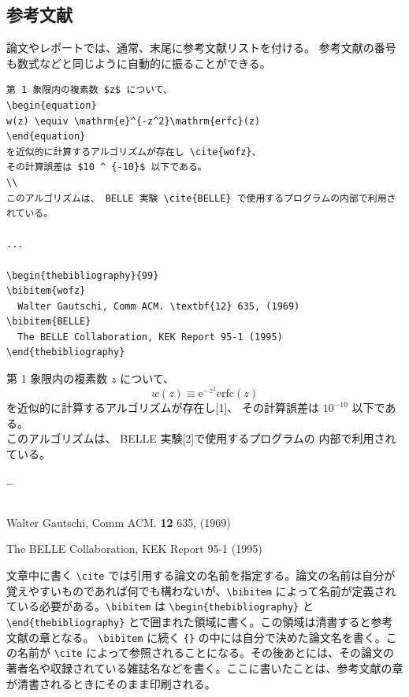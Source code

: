\subsection{参考文献}
\label{sec:latex:bibliography}

論文やレポートでは、通常、末尾に参考文献リストを付ける。
参考文献の番号も数式などと同じように自動的に振ることができる。
\begin{reidai}
\begin{verbatim}
第 1 象限内の複素数 $z$ について、
\begin{equation}
w(z) \equiv \mathrm{e}^{-z^2}\mathrm{erfc}(z)
\end{equation}
を近似的に計算するアルゴリズムが存在し \cite{wofz}、
その計算誤差は $10 ^ {-10}$ 以下である。
\\
このアルゴリズムは、 BELLE 実験 \cite{BELLE} で使用するプログラムの内部で利用されている。

...

\begin{thebibliography}{99}
\bibitem{wofz}
  Walter Gautschi, Comm ACM. \textbf{12} 635, (1969) 
\bibitem{BELLE}
  The BELLE Collaboration, KEK Report 95-1 (1995)
\end{thebibliography}
\end{verbatim}
\end{reidai}
\setcounter{equation}{0}
\vspace*{-1.5em}
\begin{kekka}
  \hspace*{0.3cm}第 1 象限内の複素数 $z$ について、
  \begin{equation}
    w(z) \equiv \mathrm{e}^{-z^2}\mathrm{erfc}(z)
  \end{equation}
  を近似的に計算するアルゴリズムが存在し[1]、
  その計算誤差は $10 ^ {-10}$ 以下である。
  \\
  このアルゴリズムは、 BELLE 実験[2]で使用するプログラムの
  内部で利用されている。

  \dots

   \\

  \noindent [1] Walter Gautschi, Comm ACM. \textbf{12} 635, (1969)

  \noindent [2] The BELLE Collaboration, KEK Report 95-1 (1995)
\end{kekka} \noindent
文章中に書く \verb|\cite| では引用する論文の名前を指定する。論文の名前は自分が覚えやすいものであれば何でも構わないが、\verb|\bibitem| によって名前が定義されている必要がある。\verb|\bibitem| は \verb|\begin{thebibliography}| と \verb|\end{thebibliography}| とで囲まれた領域に書く。この領域は清書すると参考文献の章となる。
\verb|\bibitem| に続く {\tt \{\}} の中には自分で決めた論文名を書く。この名前が \verb|\cite| によって参照されることになる。その後あとには、その論文の著者名や収録されている雑誌名などを書く。ここに書いたことは、参考文献の章が清書されるときにそのまま印刷される。

